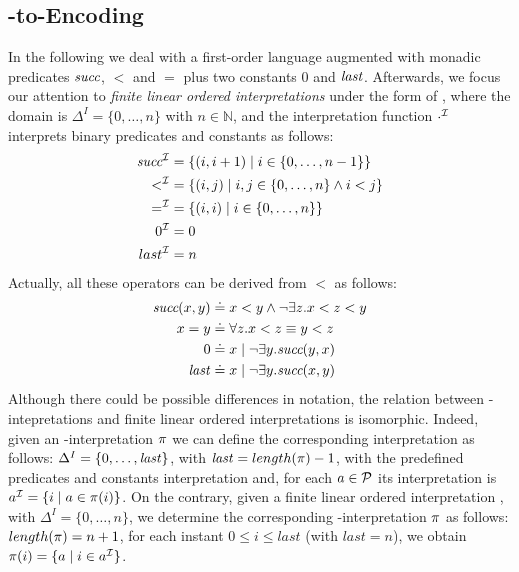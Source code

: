 \subsection{\LTLf-to-\FOL Encoding}\label{subsec:ltlf-to-fol}
In the following we deal with a first-order language augmented with monadic predicates $\suc$, $<$ and $=$ plus two constants $0$ and $\last$. Afterwards, we focus our attention to \emph{finite linear ordered \FOL interpretations} under the form of \folInter, where the domain is $\Delta^{I} = \{0,\dots,n\}$ with $n \in \mathbb{N}$, and the interpretation function $\cdot^{\I}$ interprets binary predicates and constants as follows:
\begin{align}
\begin{aligned}
\suc^{\I} &= \{ (i,i+1) \mid i \in \{0,\dots,n-1\}\}\\
<^{\I} &= \{ (i,j) \mid i,j \in \{0,\dots,n\} \lAND i<j\}\\
=^{\I} &= \{ (i,i) \mid i \in \{0,\dots,n\}\}\\
0^{\I} &= 0\\
last^{\I} &= n
\label{monadic-predicates}
\end{aligned}
\end{align}
Actually, all these operators can be derived from $<$ as follows:
\begin{align*}
\suc(x,y) &\doteq x<y \lAND \lnot \exists z. x<z<y\\
x=y &\doteq \forall z. x<z \equiv y<z\\
0 &\doteq x \mid \lnot \exists y.\suc(y,x)\\
\last &\doteq x \mid \lnot \exists y.\suc(x,y)
\end{align*}
Although there could be possible differences in notation, the relation between \LT-intepretations and finite linear ordered \FOL interpretations is isomorphic. Indeed, given an \LT-interpretation $\trace$ we can define the corresponding \FOL interpretation \folInter as follows: $\Delta^{I} = \{0,\dots,\last\}$, with $\last = length(\trace)-1$, with the predefined predicates and constants interpretation and, for each $a \in \P$ its interpretation is $a^{\I} = \{i \mid a \in \trace(i)\}$. On the contrary, given a finite linear ordered \FOL interpretation \folInter, with $\Delta^{I} = \{0,\dots,n\}$, we determine the corresponding \LT-interpretation $\trace$ as follows: $length(\trace) = n+1$, for each instant $0 \le i \le last$ (with $last = n$), we obtain $\trace(i)=\{a \mid i \in a^{\I}\}$.

